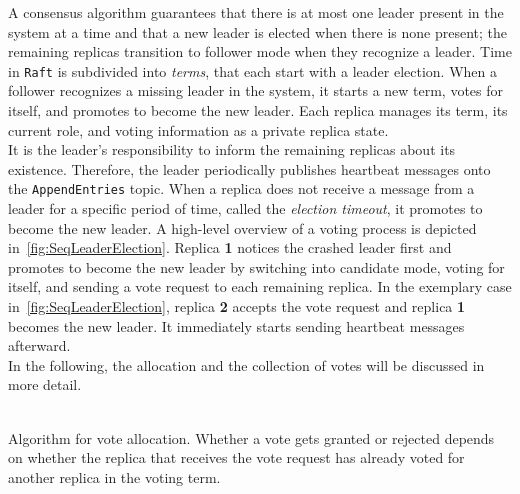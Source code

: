 A consensus algorithm guarantees that there is at most one leader present in the system at a time and that a new leader is elected when there is none present; the remaining replicas transition to follower mode when they recognize a leader.
Time in \texttt{Raft} is subdivided into \textit{terms}, that each start with a leader election.
When a follower recognizes a missing leader in the system, it starts a new term, votes for itself, and promotes to become the new leader. 
Each replica manages its term, its current role, and voting information as a private replica state.
\\

\noindent
It is the leader's responsibility to inform the remaining replicas about its existence.
Therefore, the leader periodically publishes heartbeat messages onto the \texttt{AppendEntries} topic.
When a replica does not receive a message from a leader for a specific period of time, called the \textit{election timeout}, it promotes to become the new leader.
A high-level overview of a voting process is depicted in~\autoref{fig:SeqLeaderElection}.
Replica \textbf{1} notices the crashed leader first and promotes to become the new leader by switching into candidate mode, voting for itself, and sending a vote request to each remaining replica.
In the exemplary case in~\autoref{fig:SeqLeaderElection}, replica \textbf{2} accepts the vote request and replica \textbf{1} becomes the new leader.
It immediately starts sending heartbeat messages afterward.
\\
In the following, the allocation and the collection of votes will be discussed in more detail.
\\\\

\begin{algorithm}[!hb]
\caption{Algorithm for vote allocation. Whether a vote gets granted or rejected depends on whether the replica that receives the vote request has already voted for another replica in the voting term.}\label{algo:VoteAllocation}

\BlankLine
{}
\end{algorithm}

